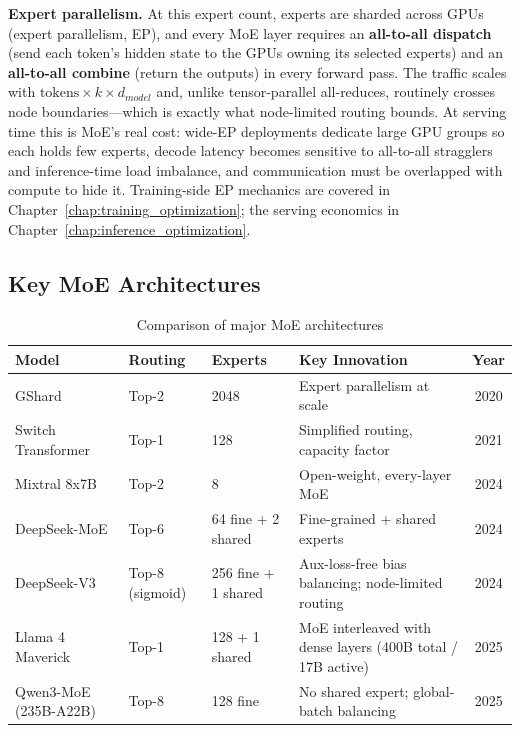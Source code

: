 \textbf{Expert parallelism.} At this expert count, experts are sharded across GPUs (expert parallelism, EP), and every MoE layer requires an \textbf{all-to-all dispatch} (send each token's hidden state to the GPUs owning its selected experts) and an \textbf{all-to-all combine} (return the outputs) in every forward pass. The traffic scales with $\text{tokens} \times k \times d_{model}$ and, unlike tensor-parallel all-reduces, routinely crosses node boundaries---which is exactly what node-limited routing bounds. At serving time this is MoE's real cost: wide-EP deployments dedicate large GPU groups so each holds few experts, decode latency becomes sensitive to all-to-all stragglers and inference-time load imbalance, and communication must be overlapped with compute to hide it. Training-side EP mechanics are covered in Chapter~\ref{chap:training_optimization}; the serving economics in Chapter~\ref{chap:inference_optimization}.

\subsection{Key MoE Architectures}

\begin{table}[H]
\centering
\caption{Comparison of major MoE architectures}
\begin{tabularx}{\textwidth}{lXXXc}
\toprule
\textbf{Model} & \textbf{Routing} & \textbf{Experts} & \textbf{Key Innovation} & \textbf{Year} \\
\midrule
GShard & Top-2 & 2048 & Expert parallelism at scale & 2020 \\
Switch Transformer & Top-1 & 128 & Simplified routing, capacity factor & 2021 \\
Mixtral 8x7B & Top-2 & 8 & Open-weight, every-layer MoE & 2024 \\
DeepSeek-MoE & Top-6 & 64 fine + 2 shared & Fine-grained + shared experts & 2024 \\
DeepSeek-V3 & Top-8 (sigmoid) & 256 fine + 1 shared & Aux-loss-free bias balancing; node-limited routing & 2024 \\
Llama 4 Maverick & Top-1 & 128 + 1 shared & MoE interleaved with dense layers (400B total / 17B active) & 2025 \\
Qwen3-MoE (235B-A22B) & Top-8 & 128 fine & No shared expert; global-batch balancing & 2025 \\
\bottomrule
\end{tabularx}
\end{table}

